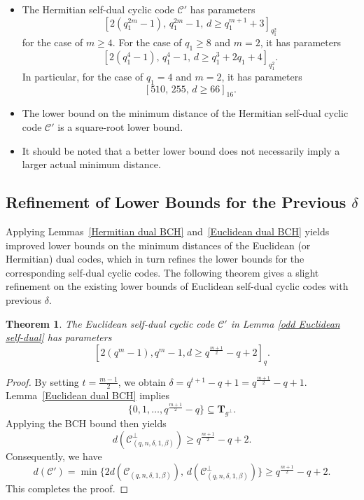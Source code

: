 \documentclass[journal,12pt,onecolumn]{IEEEtran}
\newtheorem{theorem}{Theorem}
\begin{document}
\begin{itemize}
    \item The Hermitian self-dual cyclic code $\mathcal{C}'$ has parameters
    \[
    [2(q_1^{2m} - 1),\, q_1^{2m} - 1,\, d \ge q_1^{m+1} + 3]_{q_1^2}
    \]
    for the case of $m \ge 4$. For the case of $q_1 \ge 8$ and $m = 2$, it has parameters
    \[
    [2(q_1^4 - 1),\, q_1^4 - 1,\, d \ge q_1^3 + 2q_1 + 4]_{q_1^2}.
    \]
    In particular, for the case of $q_1 = 4$ and $m = 2$, it has parameters
    \[
    [510,\, 255,\, d \ge 66]_{16}.
    \]
    \item The lower bound on the minimum distance of the Hermitian self-dual cyclic code $\mathcal{C}'$ is a square-root lower bound.
    \item It should be noted that a better lower bound does not necessarily imply a larger actual minimum distance.
\end{itemize}

\subsection{Refinement of Lower Bounds for the Previous $\delta$}

Applying Lemmas~\ref{Hermitian dual BCH} and~\ref{Euclidean dual BCH} yields improved lower bounds on the minimum distances of the Euclidean (or Hermitian) dual codes, which in turn refines the lower bounds for the corresponding self-dual cyclic codes. The following theorem gives a slight refinement on the existing lower bounds of Euclidean self-dual cyclic codes with previous $\delta$.

\begin{theorem}
    \label{new Euclidean odd}
    The Euclidean self-dual cyclic code $\mathcal{C}'$ in Lemma \ref{odd Euclidean self-dual} has parameters \[[2(q^m-1),q^m-1,d\ge q^\frac{m+1}{2}-q+2]_q.\]
\end{theorem}

\begin{proof}
    By setting $t = \frac{m-1}{2}$, we obtain $\delta = q^{t+1} - q + 1 = q^{\frac{m+1}{2}} - q + 1$. Lemma~\ref{Euclidean dual BCH} implies
\[
\{0,1,\dots,q^{\frac{m+1}{2}} - q\} \subseteq \mathbf{T}_{g^\perp}.
\]
Applying the BCH bound then yields
\[
d(\mathcal{C}^\perp_{(q,n,\delta,1,\beta)}) \ge q^{\frac{m+1}{2}} - q + 2.
\]
Consequently, we have
\[
d(\mathcal{C}') = \min\{2d(\mathcal{C}_{(q,n,\delta,1,\beta)}),\, d(\mathcal{C}^\perp_{(q,n,\delta,1,\beta)})\} \ge q^{\frac{m+1}{2}} - q + 2.
\]
This completes the proof.
\end{proof}
\end{document}
